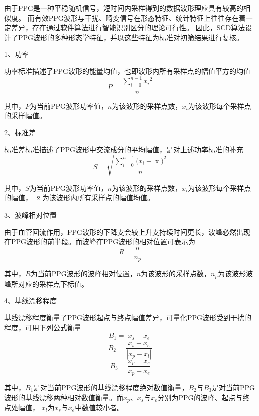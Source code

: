 由于PPG是一种平稳随机信号，短时间内采样得到的数据波形理应具有较高的相似度\cite{Qiu2012}。
而有效PPG波形与干扰、畸变信号在形态特征、统计特征上往往存在着一定差异，存在通过软件算法进行智能识别区分的理论可行性。
因此，SCD算法设计了PPG波形的多种形态学特征，并以这些特征为标准对初筛结果进行复核。

1、功率

功率标准描述了PPG波形的能量均值，也即波形内所有采样点的幅值平方的均值
\begin{equation}
    \label{equ:ppgp}
    P=\frac{\sum_{i=0}^{n-1}{x_i}^2}{n}
\end{equation}

其中，$P$为当前PPG波形功率值，$n$为该波形的采样点数，$x_i$为该波形每个采样点的采样幅值。

2、标准差

标准差标准描述了PPG波形中交流成分的平均幅值，是对上述功率标准的补充
\begin{equation}
    \label{equ:ppgstd}
    S=\sqrt{\frac{\sum_{i=0}^{n-1}{(x_i-\mathop{x} \limits^-})^2}{n}}
\end{equation}

其中，$S$为当前PPG波形功率值，$n$为该波形的采样点数，$x_i$为该波形每个采样点的幅值， $\mathop{x} \limits^-$为该波形内所有采样点的幅值均值。

3、波峰相对位置 

由于血管回流作用，PPG波形的下降支会较上升支持续时间更长，波峰必然出现在PPG波形的前半段。而波峰在PPG波形的相对位置可表示为
\begin{equation}
    \label{equ:rpeak}
    R = \frac{n}{n_p}
\end{equation}

其中，$R$为当前PPG波形的波峰相对位置，$n$为该波形的采样点数，$n_p$为该波形波峰所对应的采样点下标值。

4、基线漂移程度 

基线漂移程度衡量了PPG波形起点与终点幅值差异，可量化PPG波形受到干扰的程度，可用下列公式衡量
\begin{equation}
    \label{equ:b1}
    B_1 = |x_s-x_e|
\end{equation}
\begin{equation}
    \label{equ:b2}
    B_2 = \frac{|x_s-x_e|}{|x_p-x_l|}
\end{equation}
\begin{equation}
    \label{equ:b3}
    B_3 = \frac{x_p-x_s}{x_p-x_e}
\end{equation}

其中，$B_1$是对当前PPG波形的基线漂移程度绝对数值衡量，$B_2$与$B_3$是对当前PPG波形的基线漂移两种相对数值衡量。而$x_p$、$x_s$与$x_e$分别为PPG的波峰、起点与终点处幅值，
$x_l$为$x_s$与$x_e$中数值较小者。

